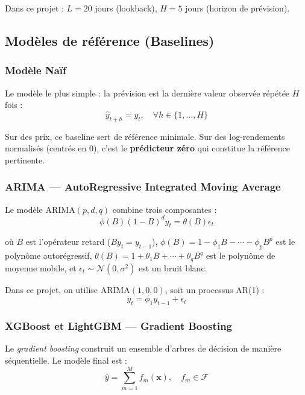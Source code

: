 \documentclass[12pt,a4paper]{article}
\newcommand{\N}{\mathcal{N}}
\begin{document}
Dans ce projet : $L = 20$ jours (lookback), $H = 5$ jours (horizon de pr\'evision).

\subsection{Mod\`eles de r\'ef\'erence (Baselines)}

\subsubsection{Mod\`ele Na\"if}

Le mod\`ele le plus simple : la pr\'evision est la derni\`ere valeur observ\'ee r\'ep\'et\'ee $H$ fois :
\begin{equation}
\hat{y}_{t+h} = y_t, \quad \forall h \in \{1, \ldots, H\}
\end{equation}

Sur des prix, ce baseline sert de r\'ef\'erence minimale. Sur des log-rendements normalis\'es (centr\'es en 0), c'est le \textbf{pr\'edicteur z\'ero} qui constitue la r\'ef\'erence pertinente.

\subsubsection{ARIMA --- AutoRegressive Integrated Moving Average}

Le mod\`ele ARIMA$(p,d,q)$ combine trois composantes :
\begin{equation}
\phi(B)(1-B)^d y_t = \theta(B) \epsilon_t
\end{equation}

o\`u $B$ est l'op\'erateur retard ($By_t = y_{t-1}$), $\phi(B) = 1 - \phi_1 B - \cdots - \phi_p B^p$ est le polyn\^ome autor\'egressif, $\theta(B) = 1 + \theta_1 B + \cdots + \theta_q B^q$ est le polyn\^ome de moyenne mobile, et $\epsilon_t \sim \N(0, \sigma^2)$ est un bruit blanc.

Dans ce projet, on utilise ARIMA$(1,0,0)$, soit un processus AR(1) :
\begin{equation}
y_t = \phi_1 y_{t-1} + \epsilon_t
\end{equation}

\subsubsection{XGBoost et LightGBM --- Gradient Boosting}

Le \textit{gradient boosting} construit un ensemble d'arbres de d\'ecision de mani\`ere s\'equentielle. Le mod\`ele final est :
\begin{equation}
\hat{y} = \sum_{m=1}^{M} f_m(\bm{x}), \quad f_m \in \mathcal{F}
\end{equation}
\end{document}
